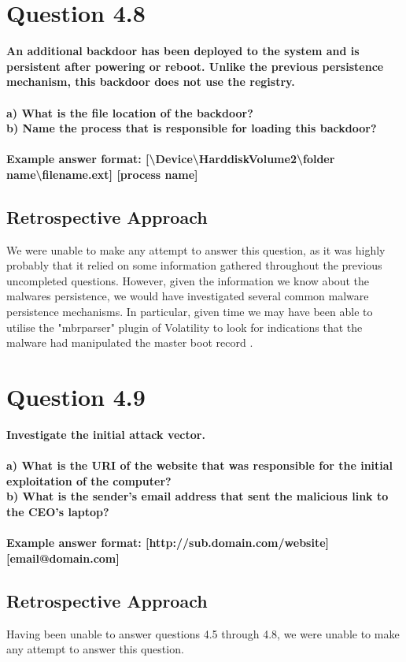 \section{Question 4.8}
\textbf{An additional backdoor has been deployed to the system and is persistent
after powering or reboot. Unlike the previous persistence mechanism, this
backdoor does not use the registry.
\\
\\a) What is the file location of the backdoor?
\\b) Name the process that is responsible for loading this backdoor?
\\\\
Example answer format:
[\textbackslash{}Device\textbackslash{}HarddiskVolume2\textbackslash{}folder
name\textbackslash{}filename.ext] [process name]}
\subsection{Retrospective Approach}
We were unable to make any attempt to answer this question, as it was highly probably that it relied on some information gathered throughout the previous uncompleted questions. However, given the information we know about the malwares persistence, we would have investigated several common malware persistence mechanisms. In particular, given time we may have been able to utilise the "mbrparser" plugin of Volatility to look for indications that the malware had manipulated the master boot record \cite[p.364]{malcook}. 

\section{Question 4.9}
\textbf{Investigate the initial attack vector.
\\
\\a) What is the URI of the website that was responsible for the initial
exploitation of the computer?
\\b) What is the sender's email address that sent the malicious link to the
CEO's laptop?
\\\\
Example answer format: [http://sub.domain.com/website] [email@domain.com]}
\subsection{Retrospective Approach}
Having been unable to answer questions 4.5 through 4.8, we were unable to make any attempt to answer this question.
